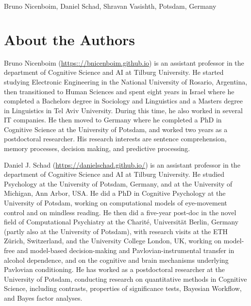 \documentclass[12pt,]{krantz}
\theoremstyle{definition}
\theoremstyle{definition}
\theoremstyle{definition}
\theoremstyle{remark}
\begin{document}
\begin{flushright}
Bruno Nicenboim,
Daniel Schad,
Shravan Vasishth,
Potsdam, Germany
\end{flushright}

\hypertarget{about-the-authors}{%
\chapter*{About the Authors}\label{about-the-authors}}


Bruno Nicenboim (\url{https:://bnicenboim.github.io}) is an assistant professor in the department of Cognitive Science and AI at Tilburg University. He started studying Electronic Engineering in the National University of Rosario, Argentina, then transitioned to Human Sciences and spent eight years in Israel where he completed a Bachelors degree in Sociology and Linguistics and a Masters degree in Linguistics in Tel Aviv University. During this time, he also worked in several IT companies. He then moved to Germany where he completed a PhD in Cognitive Science at the University of Potsdam, and worked two years as a postdoctoral researcher. His research interests are sentence comprehension, memory processes, decision making, and predictive processing.

Daniel J. Schad (\url{https://danielschad.github.io/}) is an assistant professor in the department of Cognitive Science and AI at Tilburg University. He studied Psychology at the University of Potsdam, Germany, and at the University of Michigan, Ann Arbor, USA. He did a PhD in Cognitive Psychology at the University of Potsdam, working on computational models of eye-movement control and on mindless reading. He then did a five-year post-doc in the novel field of Computational Psychiatry at the Charité, Universität Berlin, Germany (partly also at the University of Potsdam), with research visits at the ETH Zürich, Switzerland, and the University College London, UK, working on model-free and model-based decision-making and Pavlovian-instrumental transfer in alcohol dependence, and on the cognitive and brain mechanisms underlying Pavlovian conditioning. He has worked as a postdoctoral researcher at the University of Potsdam, conducting research on quantitative methods in Cognitive Science, including contrasts, properties of significance tests, Bayesian Workflow, and Bayes factor analyses.
\end{document}
